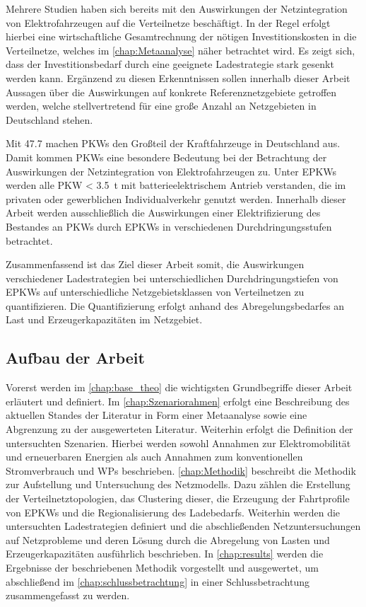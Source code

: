 Mehrere Studien haben sich bereits mit den Auswirkungen der Netzintegration von Elektrofahrzeugen auf die Verteilnetze beschäftigt. \cite{Agora2019} \cite{DEAGH2018} \cite{BCG2018}
In der Regel erfolgt hierbei eine wirtschaftliche Gesamtrechnung der nötigen Investitionskosten in die Verteilnetze, welches im \autoref{chap:Metaanalyse} näher betrachtet wird.
Es zeigt sich, dass der Investitionsbedarf durch eine geeignete Ladestrategie stark gesenkt werden kann.
Ergänzend zu diesen Erkenntnissen sollen innerhalb dieser Arbeit Aussagen über die Auswirkungen auf konkrete Referenznetzgebiete getroffen werden, welche stellvertretend für eine große Anzahl an Netzgebieten in Deutschland stehen.\medskip

Mit \SI{47.7}{\MioStk} \cite{KBA2020a} machen \glspl{PKW} den Großteil der Kraftfahrzeuge in Deutschland aus.
Damit kommen \glspl{PKW} eine besondere Bedeutung bei der Betrachtung der Auswirkungen der Netzintegration von Elektrofahrzeugen zu.
Unter \glspl{EPKW} werden alle \gls{PKW} \SI{< 3.5}{\tonne} mit batterieelektrischem Antrieb verstanden, die im privaten oder gewerblichen Individualverkehr genutzt werden. \cite{BNetzA2020}
Innerhalb dieser Arbeit werden ausschließlich die Auswirkungen einer Elektrifizierung des Bestandes an \glspl{PKW} durch \glspl{EPKW} in verschiedenen Durchdringungsstufen betrachtet.\medskip

Zusammenfassend ist das Ziel dieser Arbeit somit, die Auswirkungen verschiedener Lade\-strategien bei unterschiedlichen Durchdringungstiefen von \glspl{EPKW} auf unterschiedliche Netzgebietsklassen von Verteilnetzen zu quantifizieren.
Die Quantifizierung erfolgt anhand des Abregelungsbedarfes an Last und Erzeugerkapazitäten im Netzgebiet.


\subsection{Aufbau der Arbeit}

Vorerst werden im \autoref{chap:base_theo} die wichtigsten Grundbegriffe dieser Arbeit erläutert und definiert.
Im \autoref{chap:Szenariorahmen} erfolgt eine Beschreibung des aktuellen Standes der Literatur in Form einer Metaanalyse sowie eine Abgrenzung zu der ausgewerteten Literatur.
Weiterhin erfolgt die Definition der untersuchten Szenarien.
Hierbei werden sowohl Annahmen zur Elektromobilität und erneuerbaren Energien als auch Annahmen zum konventionellen Stromverbrauch und \glspl{WP} beschrieben.
\autoref{chap:Methodik} beschreibt die Methodik zur Aufstellung und Untersuchung des Netzmodells.
Dazu zählen die Erstellung der Verteilnetztopologien, das Clustering dieser, die Erzeugung der Fahrtprofile von \glspl{EPKW} und die Regionalisierung des Ladebedarfs.
Weiterhin werden die untersuchten Ladestrategien definiert und die abschließenden Netzuntersuchungen auf Netzprobleme und deren Lösung durch die Abregelung von Lasten und Erzeugerkapazitäten ausführlich beschrieben.
In \autoref{chap:results} werden die Ergebnisse der beschriebenen Methodik vorgestellt und ausgewertet, um abschließend im \autoref{chap:schlussbetrachtung} in einer Schlussbetrachtung zusammengefasst zu werden.

